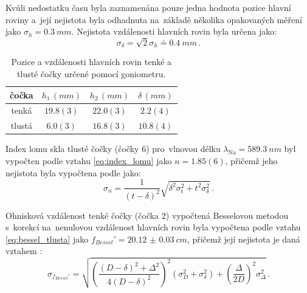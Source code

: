\documentclass{../concepts/titul_zprava_p/prepareprotokolZprava} %
\begin{document}
Kvůli nedostatku času byla zaznamenána pouze jedna hodnota pozice hlavní roviny a~její nejistota byla odhadnuta
na~základě několika opakovaných měření jako $\sigma_h = \qty{0.3}{mm}$.
Nejistota vzdálenosti hlavních rovin byla určena jako:
\begin{equation}
    \label{eq:sigma_delta_h}
    \sigma_\delta = \sqrt{2} \sigma_h \doteq \qty{0.4}{mm} \,.
\end{equation}

\begin{table}[!htbp]
\centering
\caption{Pozice a vzdálenosti hlavních rovin tenké a tlusté čočky určené pomocí goniometru.}
\begin{tabular}{cccc}
 \toprule
 čočka & $h_1 \,(\unit{mm})$ & $h_2 \,(\unit{mm})$ & $\delta \,(\unit{mm})$ \\
 \midrule
 tenká & $19.8(3)$ & $22.0(3)$ & $2.2(4)$  \\
 tlustá & $6.0(3)$ & $16.8(3)$ & $10.8(4)$  \\
 \bottomrule
\end{tabular}
\label{tab:hlavni_roviny}
\end{table}

Index lomu skla tlusté čočky (čočky 6) pro~vlnovou délku $\lambda_\mathrm{Na} = \qty{589.3}{nm}$ byl vypočten podle vztahu 
\ref{eq:index_lomu} jako $n = 1.85(6)$, přičemž jeho 
nejistota byla vypočtena podle \cite{englich} jako:
\begin{equation}
    \label{eq:sigma_n}
    \sigma_n = \frac{1}{\left(t-\delta\right)^2} \sqrt{ \delta^2 \sigma_t^2 + t^2 \sigma_\delta^2} \,.
\end{equation}

Ohnisková vzdálenost tenké čočky (čočka 2) vypočtená Besselovou metodou s~korekcí na~nenulovou vzdálenost hlavních rovin
byla vypočtena podle vztahu \ref{eq:bessel_tlusta} jako $f_{Bessel}' = \qty{20.12(3)}{cm}$, přičemž její nejistota
je daná vztahem \cite{englich}:
\begin{equation}
    \label{eq:sigma_f_bessel_tlusta}
    \sigma_{f_{Bessel}'} = \sqrt{ \left(\frac{\left(D-\delta\right)^2 + \Delta^2}{4 \left(D-\delta\right)^2}\right)^2 
    \left(\sigma_D^2 + \sigma_\delta^2\right) + 
    \left(\frac{\Delta}{2 D}\right)^2 \sigma_{\Delta}^2 } \,.
\end{equation}
\end{document}
